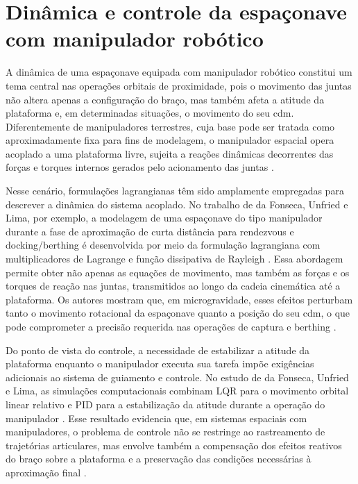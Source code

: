 \section{Dinâmica e controle da espaçonave com manipulador robótico}

A dinâmica de uma espaçonave equipada com manipulador robótico constitui um tema central nas operações orbitais de proximidade, pois o movimento das juntas não altera apenas a configuração do braço, mas também afeta a atitude da plataforma e, em determinadas situações, o movimento do seu \gls{cdm}. Diferentemente de manipuladores terrestres, cuja base pode ser tratada como aproximadamente fixa para fins de modelagem, o manipulador espacial opera acoplado a uma plataforma livre, sujeita a reações dinâmicas decorrentes das forças e torques internos gerados pelo acionamento das juntas \cite{fonseca2016dynamics,fonseca2019kinematics}.

Nesse cenário, formulações lagrangianas têm sido amplamente empregadas para descrever a dinâmica do sistema acoplado. No trabalho de da Fonseca, Unfried e Lima, por exemplo, a modelagem de uma espaçonave do tipo manipulador durante a fase de aproximação de curta distância para rendezvous e docking/berthing é desenvolvida por meio da formulação lagrangiana com multiplicadores de Lagrange e função dissipativa de Rayleigh \cite{fonseca2016dynamics}. Essa abordagem permite obter não apenas as equações de movimento, mas também as forças e os torques de reação nas juntas, transmitidos ao longo da cadeia cinemática até a plataforma. Os autores mostram que, em microgravidade, esses efeitos perturbam tanto o movimento rotacional da espaçonave quanto a posição do seu \gls{cdm}, o que pode comprometer a precisão requerida nas operações de captura e berthing \cite{fonseca2016dynamics}.

Do ponto de vista do controle, a necessidade de estabilizar a atitude da plataforma enquanto o manipulador executa sua tarefa impõe exigências adicionais ao sistema de guiamento e controle. No estudo de da Fonseca, Unfried e Lima, as simulações computacionais combinam LQR para o movimento orbital linear relativo e PID para a estabilização da atitude durante a operação do manipulador \cite{fonseca2016dynamics}. Esse resultado evidencia que, em sistemas espaciais com manipuladores, o problema de controle não se restringe ao rastreamento de trajetórias articulares, mas envolve também a compensação dos efeitos reativos do braço sobre a plataforma e a preservação das condições necessárias à aproximação final \cite{fonseca2016dynamics}.

